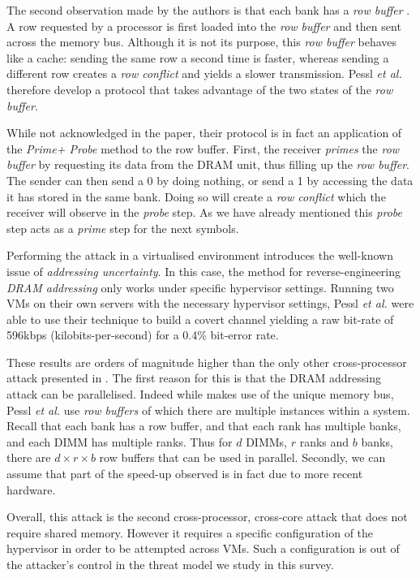 \documentclass[orivec,envcountsame, a4paper, 11pt]{llncs}
\begin{document}
The second observation made by the authors is that each bank has a \textit{row buffer} \cite{Pessl2016}. A row requested by a processor is first loaded into the \textit{row buffer} and then sent across the memory bus. Although it is not its purpose, this \textit{row buffer} behaves like a cache: sending the same row a second time is faster, whereas sending a different row creates a \textit{row conflict} and yields a slower transmission. Pessl \textit{et al.} \cite{Pessl2016} therefore develop a protocol that takes advantage of the two states of the \textit{row buffer}.

While not acknowledged in the paper, their protocol is in fact an application of the \textit{Prime+ Probe} method to the row buffer. First, the receiver \textit{primes} the \textit{row buffer} by requesting its data from the DRAM unit, thus filling up the \textit{row buffer}. The sender can then send a 0 by doing nothing, or send a 1 by accessing the data it has stored in the same bank. Doing so will create a \textit{row conflict} which the receiver will observe in the \textit{probe} step. As we have already mentioned this \textit{probe} step acts as a \textit{prime} step for the next symbols.


Performing the attack in a virtualised environment introduces the well-known issue of \textit{addressing uncertainty}. In this case, the method for reverse-engineering \textit{DRAM addressing} only works under specific hypervisor settings. Running two VMs on their own servers with the necessary hypervisor settings, Pessl \textit{et al.} \cite{Pessl2016} were able to use their technique to build a covert channel yielding a raw bit-rate of 596kbps (kilobits-per-second) for a 0.4\% bit-error rate. 

These results are orders of magnitude higher than the only other cross-processor attack presented in \cite{Wu2012}. The first reason for this is that the DRAM addressing attack can be parallelised. Indeed while \cite{Wu2012} makes use of the unique memory bus, Pessl \textit{et al.} \cite{Pessl2016} use \textit{row buffers} of which there are multiple instances within a system. Recall that each bank has a row buffer, and that each rank has multiple banks, and each DIMM has multiple ranks. Thus for $d$ DIMMs, $r$ ranks and $b$ banks, there are $d \times r \times b$ row buffers that can be used in parallel. Secondly, we can assume that part of the speed-up observed is in fact due to more recent hardware.

Overall, this attack is the second cross-processor, cross-core attack that does not require shared memory. However it requires a specific configuration of the hypervisor in order to be attempted across VMs. Such a configuration is out of the attacker's control in the threat model we study in this survey.
\end{document}
